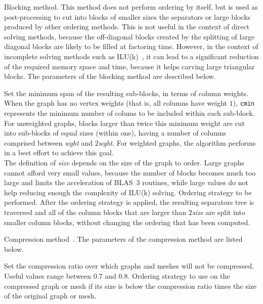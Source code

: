 \begin{itemize}
\iteme[{\tt b}]
Blocking method. This method does not perform ordering by itself, but
is used as post-processing to cut into blocks of smaller sizes the
separators or large blocks produced by other ordering methods. This is
not useful in the context of direct solving methods, because the
off-diagonal blocks created by the splitting of large diagonal blocks
are likely to be filled at factoring time. However, in the context of
incomplete solving methods such as ILU(k)~\cite{heperaro04a}, it can
lead to a significant reduction of the required memory space and time,
because it helps carving large triangular blocks.
The parameters of the blocking method are described below.
\begin{itemize}
\iteme[{\tt cmin=}{\it wght}]
Set the minimum span of the resulting sub-blocks, in terms of column
weights. When the graph has no vertex weights (that is, all columns
have weight $1$), \texttt{cmin} represents the minimum number of
colums to be included within each sub-block.
For unweighted graphs, blocks larger than twice this minimum weight
are cut into sub-blocks of equal sizes (within one), having a number
of columns comprised between {\it wght} and $2${\it wght}. For
weighted graphs, the algorithm performs in a best effort to achieve
this goal.
\\
The definition of {\it size} depends on the size of the graph
to order. Large graphs cannot afford very small values, because the
number of blocks becomes much too large and limits the acceleration
of BLAS~3 routines, while large values do not help reducing enough
the complexity of ILU(k) solving.
\iteme[{\tt strat=}{\it strat}]
Ordering strategy to be performed. After the ordering strategy is
applied, the resulting separators tree is traversed and all of the
column blocks that are larger than $2${\it size} are split into
smaller column blocks, without changing the ordering that has been
computed.
\end{itemize}
\iteme[{\tt c}]
\label{sec-lib-meth-compress}
Compression method~\cite{ashc95}.
The parameters of the compression method are listed below.
\begin{itemize}
\iteme[{\tt rat=}{\it rat}]
Set the compression ratio over which graphs and meshes will not be
compressed. Useful values range between $0.7$ and $0.8$.
\iteme[{\tt cpr=}{\it strat}]
Ordering strategy to use on the compressed graph or mesh if its size
is below the compression ratio times the size of the original graph
or mesh.
\iteme[{\tt unc=}{\it strat}]

\end{itemize}
\end{itemize}
